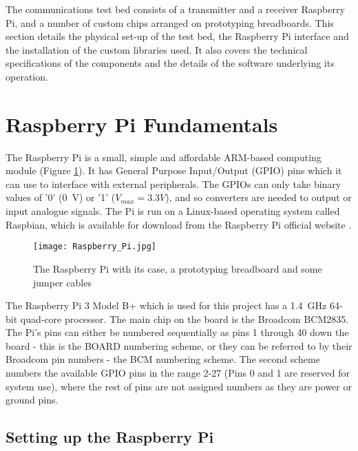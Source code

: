 \documentclass[../main.tex]{subfiles}
\begin{document}
The communications test bed consists of a transmitter and a receiver Raspberry Pi, and a number of custom chips arranged on prototyping breadboards.
This section details the physical set-up of the test bed, the Raspberry Pi interface and the installation of the custom libraries used.
It also covers the technical specifications of the components and the details of the software underlying its operation.


\section{Raspberry Pi Fundamentals}

The Raspberry Pi is a small, simple and affordable ARM-based computing module (Figure \ref{fig_Raspberry Pi}).
It has General Purpose Input/Output (GPIO) pins which it can use to interface with external peripherals.
The GPIOs can only take binary values of '0' (\SI{0}{\volt}) or '1' ($V_{max} = 3.3V$), and so converters are needed to output or input analogue signals.
The Pi is run on a Linux-based operating system called Raspbian, which is available for download from the Raspberry Pi official website
\cite{lib_Raspbian}.\\

\begin{figure}[ht]
	\centering
	\texttt{[image: Raspberry\_Pi.jpg]}
	\caption{The Raspberry Pi with its case, a prototyping breadboard and some jumper cables}
	\label{fig_Raspberry Pi}
\end{figure}

The Raspberry Pi 3 Model B+ which is used for this project has a \SI{1.4}{\giga\hertz} 64-bit quad-core processor.
The main chip on the board is the Broadcom BCM2835.
The Pi's pins can either be numbered sequentially as pins 1 through 40 down the board - this is the BOARD numbering scheme, or they can be referred to by their Broadcom pin numbers - the BCM numbering scheme.
The second scheme numbers the available GPIO pins in the range 2-27 (Pins 0 and 1 are reserved for system use), where the rest of pins are not assigned numbers as they are power or ground pins.

\subsection{Setting up the Raspberry Pi}
\end{document}
